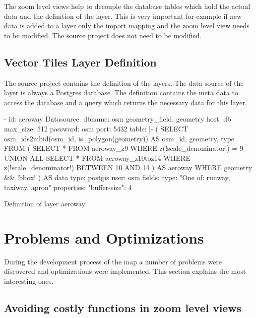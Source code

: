 The zoom level views help to decouple the database tables which hold the actual data and the definition of the layer. This is very important for example if new data is added to a layer only the import mapping and the zoom level view needs to be modified. The source project does not need to be modified.

\subsection{Vector Tiles Layer Definition}

The source project contains the definition of the layers. The data source of the layer is always a Postgres database. The definition contains the meta data to access the database and a query which returns the necessary data for this layer. 

\begin{listing}[H]
\begin{yamlcode}
- id: aeroway
    Datasource: 
      dbname: osm
      geometry_field: geometry
      host: db
      max_size: 512
      password: osm
      port: 5432
      table: |-
        (
          SELECT osm_ids2mbid(osm_id, is_polygon(geometry)) AS osm_id, geometry, type
          FROM (
            SELECT *
            FROM aeroway_z9
            WHERE z(!scale_denominator!) = 9
            UNION ALL
            SELECT *
            FROM aeroway_z10toz14
            WHERE z(!scale_denominator!) BETWEEN 10 AND 14
          ) AS aeroway
          WHERE geometry && !bbox!
        ) AS data
      type: postgis
      user: osm
    fields: 
      type: "One of: runway, taxiway, apron"
    properties: 
      "buffer-size": 4
\end{yamlcode}
\caption{Definition of layer aeroway}
\label{definition_of_layer}
\end{listing}

\section{Problems and Optimizations}

During the development process of the map a number of problems were discovered and optimizations were implemented. This section explains the most interesting ones.

\subsection{Avoiding costly functions in zoom level views}

